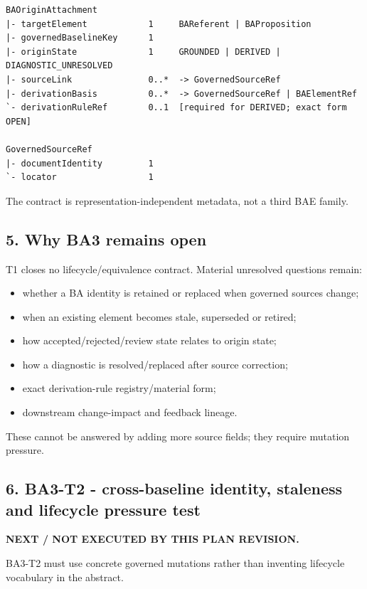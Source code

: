\documentclass[11pt,a4paper]{article}
\providecommand{\tightlist}{\setlength{\itemsep}{0pt}\setlength{\parskip}{0pt}}
\begin{document}
\begin{verbatim}
BAOriginAttachment
|- targetElement            1     BAReferent | BAProposition
|- governedBaselineKey      1
|- originState              1     GROUNDED | DERIVED | DIAGNOSTIC_UNRESOLVED
|- sourceLink               0..*  -> GovernedSourceRef
|- derivationBasis          0..*  -> GovernedSourceRef | BAElementRef
`- derivationRuleRef        0..1  [required for DERIVED; exact form OPEN]

GovernedSourceRef
|- documentIdentity         1
`- locator                  1
\end{verbatim}

The contract is representation-independent metadata, not a third BAE family.

\subsection{5. Why BA3 remains open}\label{5-why-ba3-remains-open}

T1 closes no lifecycle/equivalence contract. Material unresolved questions remain:

\begin{itemize}
\tightlist
\item
  whether a BA identity is retained or replaced when governed sources change;
\item
  when an existing element becomes stale, superseded or retired;
\item
  how accepted/rejected/review state relates to origin state;
\item
  how a diagnostic is resolved/replaced after source correction;
\item
  exact derivation-rule registry/material form;
\item
  downstream change-impact and feedback lineage.
\end{itemize}

These cannot be answered by adding more source fields; they require mutation pressure.

\subsection{6. BA3-T2 - cross-baseline identity, staleness and lifecycle pressure test}\label{6-ba3-t2---cross-baseline-identity-staleness-and-lifecycle-pressure-test}

\textbf{NEXT / NOT EXECUTED BY THIS PLAN REVISION.}

BA3-T2 must use concrete governed mutations rather than inventing lifecycle vocabulary in the abstract.
\end{document}
